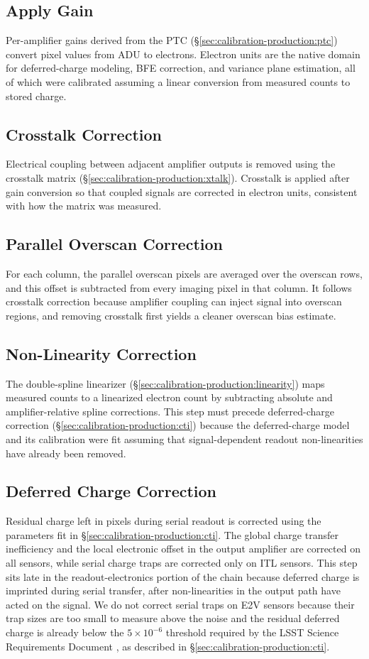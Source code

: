 \subsection{Apply Gain}
Per-amplifier gains derived from the PTC (\S\ref{sec:calibration-production:ptc}) convert pixel values from ADU to electrons.
Electron units are the native domain for deferred-charge modeling, BFE correction, and variance plane estimation, all of which were calibrated assuming a linear conversion from measured counts to stored charge.

\subsection{Crosstalk Correction}
Electrical coupling between adjacent amplifier outputs is removed using the crosstalk matrix (\S\ref{sec:calibration-production:xtalk}).
Crosstalk is applied after gain conversion so that coupled signals are corrected in electron units, consistent with how the matrix was measured.

\subsection{Parallel Overscan Correction}
For each column, the parallel overscan pixels are averaged over the overscan rows, and this offset is subtracted from every imaging pixel in that column.
It follows crosstalk correction because amplifier coupling can inject signal into overscan regions, and removing crosstalk first yields a cleaner overscan bias estimate.

\subsection{Non-Linearity Correction}
The double-spline linearizer (\S\ref{sec:calibration-production:linearity}) maps measured counts to a linearized electron count by subtracting absolute and amplifier-relative spline corrections.
This step must precede deferred-charge correction (\S\ref{sec:calibration-production:cti}) because the deferred-charge model and its calibration were fit assuming that signal-dependent readout non-linearities have already been removed.

\subsection{Deferred Charge Correction}
Residual charge left in pixels during serial readout is corrected using the parameters fit in \S\ref{sec:calibration-production:cti}.
The global charge transfer inefficiency and the local electronic offset in the output amplifier are corrected on all sensors, while serial charge traps are corrected only on ITL sensors.
This step sits late in the readout-electronics portion of the chain because deferred charge is imprinted during serial transfer, after non-linearities in the output path have acted on the signal.
We do not correct serial traps on E2V sensors because their trap sizes are too small to measure above the noise and the residual deferred charge is already below the $5\times10^{-6}$ threshold required by the LSST Science Requirements Document \citep{LPM-17}, as described in \S\ref{sec:calibration-production:cti}.

